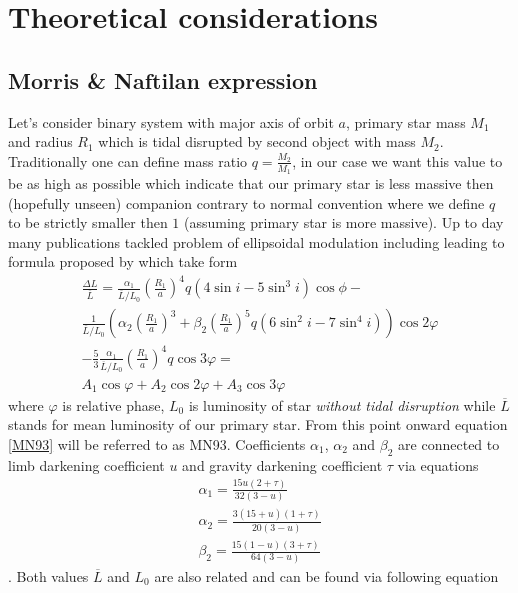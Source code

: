 \documentclass{pracalicmgr}
\begin{document}
\chapter{Theoretical considerations}\label{theo}
\section{Morris \& Naftilan expression}
\hspace{1cm} Let's consider binary system with major axis of orbit $a$, primary star mass $M_1$ and radius $R_1$ which is tidal disrupted by second object with mass $M_2$.
Traditionally one can define mass ratio $q=\frac{M_2}{M_1}$, in our case we want this value to be as high as possible which indicate that our primary star
is less massive then (hopefully unseen) companion contrary to normal convention where we define $q$ to be strictly smaller then $1$ (assuming primary star is more massive).
Up to day many publications tackled problem of ellipsoidal modulation including \citep{kopal_close_1959} leading to formula proposed by \citep{morris_equations_1993} which take 
form 
\begin{align}\label{MN93}
    \frac{\Delta{L}}{\overline{L}}=\frac{\alpha_1}{\overline{L}/L_0}\left(\frac{R_1}{a}\right)^4q\left(4\sin{i}-5\sin^3{i}\right)\cos{\phi}- \\
    \frac{1}{\overline{L}/L_0}\left(\alpha_2\left(\frac{R_1}{a}\right)^3+\beta_2
    \left(\frac{R_1}{a}\right)^5q\left(6\sin^2{i}-7\sin^4{i}\right)\right)\cos{2\varphi} \\
    -\frac{5}{3}\frac{\alpha_1}{\overline{L}/L_0}\left(\frac{R_1}{a}\right)^4q\cos{3\varphi}=\\
    A_1\cos{\varphi}+A_2\cos{2\varphi}+A_3\cos{3\varphi}
\end{align}
where $\varphi$ is relative phase, $L_0$ is luminosity of star {\it without tidal disruption} while $\overline{L}$ stands for mean luminosity of our primary star. From this point
onward equation \ref{MN93} will be referred to as MN93.
Coefficients $\alpha_1$, $\alpha_2$ and
$\beta_2$ are connected to limb darkening coefficient $u$ and gravity darkening coefficient $\tau$ via equations
\begin{align}
    \alpha_1=\frac{15u(2+\tau)}{32(3-u)}\\
    \alpha_2=\frac{3(15+u)(1+\tau)}{20(3-u)}\\
    \beta_2=\frac{15(1-u)(3+\tau)}{64(3-u)}
\end{align}. 
Both values $\overline{L}$ and $L_0$ are also related and can be found via following equation
\end{document}
